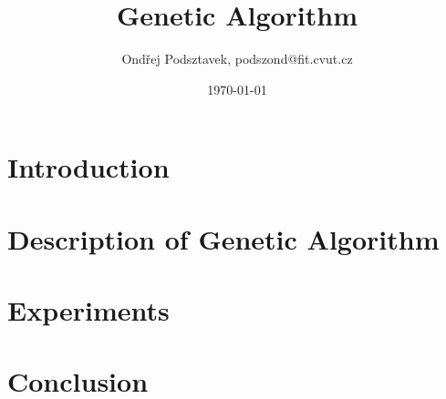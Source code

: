 \documentclass[a4paper,10pt,twocolumn]{article}
\title{Genetic Algorithm}
\date{\today}
\author{Ondřej Podsztavek, podszond@fit.cvut.cz}
\begin{document}
\maketitle

\section{Introduction}

\section{Description of Genetic Algorithm}

\cite{deap_jmlr2012}

\section{Experiments}

\section{Conclusion}

{}

\end{document}
